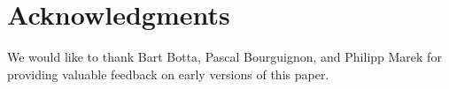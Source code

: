 \section{Acknowledgments} 

We would like to thank Bart Botta, Pascal Bourguignon, and Philipp
Marek for providing valuable feedback on early versions of this paper.
